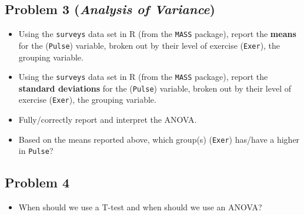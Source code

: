 \documentclass{article}
\begin{document}
\subsection*{Problem 3 (\textit{Analysis of Variance})}
\begin{itemize}
\item Using the \texttt{surveys} data set in R (from the \texttt{MASS} package), report the \textbf{means} for the (\texttt{Pulse}) variable, broken out by their level of exercise (\texttt{Exer}), the grouping variable.
\item Using the \texttt{surveys} data set in R (from the \texttt{MASS} package), report the \textbf{standard deviations} for the (\texttt{Pulse}) variable, broken out by their level of exercise (\texttt{Exer}), the grouping variable.
\item Fully/correctly report and interpret the ANOVA.
\item Based on the means reported above, which group(s) (\texttt{Exer}) has/have a higher in \texttt{Pulse}?
\end{itemize}

\subsection*{Problem 4}
\begin{itemize}
\item When should we use a T-test and when should we use an ANOVA?
\end{itemize}
\end{document}
